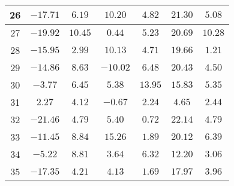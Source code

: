 \begin{table}[H]
\begin{tabular}{|c|c|c|c|c|c|c|}
                    26     & $-17.71$    &$6.19$   &  $10.20$  & $4.82$   & $21.30$  & $5.08$  \\ \hline
                    27     & $-19.92$    &$10.45$  &  $0.44$   & $5.23$   & $20.69$  & $10.28$ \\ \hline
                    28     & $-15.95$    &$2.99$   &  $10.13$  & $4.71$   & $19.66$  & $1.21$  \\ \hline
                    29     & $-14.86$    &$8.63$   &  $-10.02$ & $6.48$   & $20.43$  & $4.50$  \\ \hline
                    30     & $-3.77$     &$6.45$   &  $5.38$   & $13.95$  & $15.83$  & $5.35$  \\ \hline
                    31     & $2.27$      &$4.12$   &  $-0.67$  & $2.24$   & $4.65$   & $2.44$  \\ \hline
                    32     & $-21.46$    &$4.79$   &  $5.40$   & $0.72$   & $22.14$  & $4.79$  \\ \hline
                    33     & $-11.45$    &$8.84$   &  $15.26$  & $1.89$   & $20.12$  & $6.39$  \\ \hline
                    34     & $-5.22$     &$8.81$   &  $3.64$   & $6.32$   & $12.20$  & $3.06$  \\ \hline
                    35     & $-17.35$    &$4.21$   &  $4.13$   & $1.69$   & $17.97$  & $3.96$  \\ \hline
    \end{tabular}
    \label{tab:media_lab_6_vertical}
\end{table}

